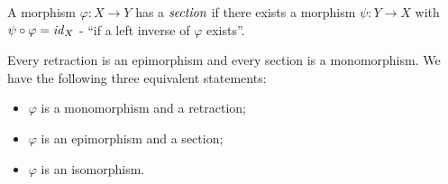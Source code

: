 \begin{defn}[Section]
 A morphism $\varphi: X \to Y$ has a $\emph{section}$ if there exists a morphism $\psi: Y \to X$ with $\psi \circ \varphi = \mathit{id}_{X}$ - ``if a left inverse of $\varphi$ exists''.
\end{defn}

\begin{lem}
Every retraction is an epimorphism and every section is a monomorphism.
We have the following three equivalent statements:
\begin{itemize}
\item $\varphi$ is a monomorphism and a retraction;
\item $\varphi$ is an epimorphism and a section;
\item $\varphi$ is an isomorphism.
\end{itemize}
\end{lem}